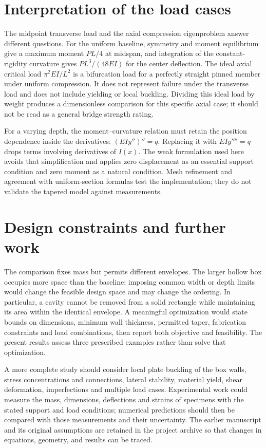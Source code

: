 \documentclass[11pt]{article}
\begin{document}
\section{Interpretation of the load cases}
The midpoint transverse load and the axial compression eigenproblem answer different questions. For the uniform baseline, symmetry and moment equilibrium give a maximum moment $PL/4$ at midspan, and integration of the constant-rigidity curvature gives $PL^3/(48EI)$ for the center deflection. The ideal axial critical load $\pi^2EI/L^2$ is a bifurcation load for a perfectly straight pinned member under uniform compression. It does not represent failure under the transverse load and does not include yielding or local buckling. Dividing this ideal load by weight produces a dimensionless comparison for this specific axial case; it should not be read as a general bridge strength rating.

For a varying depth, the moment--curvature relation must retain the position dependence inside the derivatives: $(EIy'')''=q$. Replacing it with $EIy''''=q$ drops terms involving derivatives of $I(x)$. The weak formulation used here avoids that simplification and applies zero displacement as an essential support condition and zero moment as a natural condition. Mesh refinement and agreement with uniform-section formulas test the implementation; they do not validate the tapered model against measurements.

\section{Design constraints and further work}
The comparison fixes mass but permits different envelopes. The larger hollow box occupies more space than the baseline; imposing common width or depth limits would change the feasible design space and may change the ordering. In particular, a cavity cannot be removed from a solid rectangle while maintaining its area within the identical envelope. A meaningful optimization would state bounds on dimensions, minimum wall thickness, permitted taper, fabrication constraints and load combinations, then report both objective and feasibility. The present results assess three prescribed examples rather than solve that optimization.

A more complete study should consider local plate buckling of the box walls, stress concentrations and connections, lateral stability, material yield, shear deformation, imperfections and multiple load cases. Experimental work could measure the mass, dimensions, deflections and strains of specimens with the stated support and load conditions; numerical predictions should then be compared with those measurements and their uncertainty. The earlier manuscript and its original assumptions are retained in the project archive so that changes in equations, geometry, and results can be traced.
\end{document}
